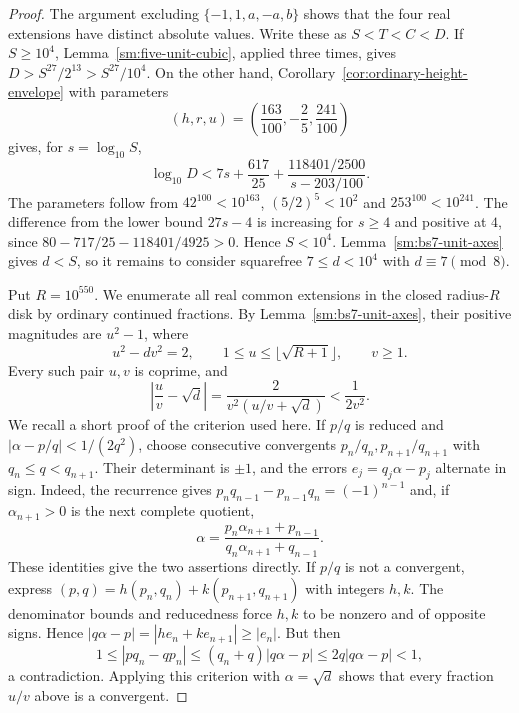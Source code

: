 \documentclass[12pt]{article}
\numberwithin{equation}{section}
\begin{document}
\begin{proof}
The argument excluding $\{-1,1,a,-a,b\}$ shows that the four real extensions have distinct absolute values. Write these as $S<T<C<D$. If $S\ge10^4$, Lemma~\ref{sm:five-unit-cubic}, applied three times, gives $D>S^{27}/2^{13}>S^{27}/10^4$. On the other hand, Corollary~\ref{cor:ordinary-height-envelope} with parameters
\[
 (h,r,u)=\left(\frac{163}{100},-\frac25,\frac{241}{100}\right)
\]
gives, for $s=\log_{10}S$,
\[
 \log_{10}D<7s+\frac{617}{25}
       +\frac{118401/2500}{s-203/100}.
\]
The parameters follow from $42^{100}<10^{163}$, $(5/2)^5<10^2$ and $253^{100}<10^{241}$. The difference from the lower bound $27s-4$ is increasing for $s\ge4$ and positive at $4$, since
$80-717/25-118401/4925>0$. Hence $S<10^4$.
Lemma~\ref{sm:bs7-unit-axes} gives $d<S$, so it remains to consider squarefree $7\le d<10^4$ with $d\equiv7\pmod8$.

Put $R=10^{550}$. We enumerate all real common extensions in the closed radius-$R$ disk by ordinary continued fractions. By Lemma~\ref{sm:bs7-unit-axes}, their positive magnitudes are $u^2-1$, where
\begin{equation*}
 u^2-dv^2=2,\qquad
 1\le u\le\lfloor\sqrt{R+1}\rfloor,\qquad v\ge1.
\end{equation*}
Every such pair $u,v$ is coprime, and
\begin{equation*}
 \left|\frac uv-\sqrt d\right|
 =\frac{2}{v^2(u/v+\sqrt d)}<\frac1{2v^2}.
\end{equation*}
We recall a short proof of the criterion used here. If $p/q$ is reduced
and $|\alpha-p/q|<1/(2q^2)$, choose consecutive convergents
$p_n/q_n,p_{n+1}/q_{n+1}$ with $q_n\le q<q_{n+1}$.
Their determinant is $\pm1$, and the errors
$e_j=q_j\alpha-p_j$ alternate in sign. Indeed, the recurrence gives
$p_nq_{n-1}-p_{n-1}q_n=(-1)^{n-1}$ and, if
$\alpha_{n+1}>0$ is the next complete quotient,
\[
 \alpha=\frac{p_n\alpha_{n+1}+p_{n-1}}
 {q_n\alpha_{n+1}+q_{n-1}}.
\]
These identities give the two assertions directly. If $p/q$ is not a convergent, express
$(p,q)=h(p_n,q_n)+k(p_{n+1},q_{n+1})$ with integers $h,k$.
The denominator bounds and reducedness force $h,k$ to be nonzero
and of opposite signs. Hence
$|q\alpha-p|=|h e_n+k e_{n+1}|\ge|e_n|$. But then
\[
 1\le|p q_n-q p_n|
 \le(q_n+q)|q\alpha-p|\le2q|q\alpha-p|<1,
\]
a contradiction. Applying this criterion with $\alpha=\sqrt d$
shows that every fraction $u/v$ above is a convergent.


\end{proof}
\end{document}
